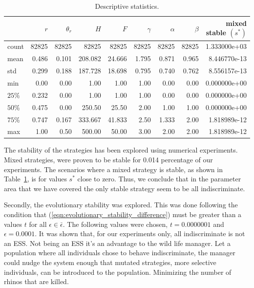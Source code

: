 \documentclass[10pt]{article}
\begin{document}
\begin{table}[!hbtp]
	\begin{center}
\begin{tabular}{lrrrrrrrr}
\toprule {} &              \(r\) &        \(\theta_r\) &              \(H\) &              \(F\) &          \(\gamma\) &          \(\alpha\) &          \(\beta\) &  mixed stable \((s^*)\)\\
\midrule
count         &  82825 &  82825 &  82825 &  82825 &  82825 &  82825 &  82825 &   1.333000e+03 \\
mean         &     0.486 &      0.101 &    208.082 &     24.666 &      1.795 &      0.871 &      0.965 & 8.446770e-13 \\
std             &       0.299 &      0.188 &    187.728 &     18.698 &      0.795 &      0.740 &      0.762 &      8.556157e-13 \\
min   		&         0.00 &      0.00 &      1.00 &      1.00 &      1.00 &      0.00 &      0.00 &    0.000000e+00 \\
\(25\)\%  	&      0.232 &      0.00 &      1.00 &      1.00 &      1.00 &      0.00 &      0.00 &     0.000000e+00 \\
\(50\)\%  	&      0.475 &      0.00 &    250.50 &     25.50 &      2.00 &      1.00 &      1.00 &      0.000000e+00 \\
\(75\)\%  	&       0.747 &      0.167 &    333.667 &     41.833 &      2.50 &      1.333 &      2.00 &        1.818989e-12 \\
max   		&       1.00 &      0.50 &    500.00 &     50.00 &      3.00 &      2.00 &      2.00 &           1.818989e-12 \\
\bottomrule
\end{tabular}
      \caption{Descriptive statistics.}
      \label{tbl:descriptive_stats}
  	\end{center}
\end{table}

The stability of the strategies has been explored using numerical experiments. 
Mixed strategies, were proven to be stable for 0.014 percentage of our
experiments. The scenarios where a mixed strategy is stable, as shown in 
Table~\ref{tbl:descriptive_stats}, is for values \(s^*\)  close to zero. Thus, we
conclude that in the parameter area that we have covered the only stable
strategy seem to be all indiscriminate. 

Secondly, the evolutionary stability was explored. This was done following the condition that 
(\ref{eqn:evolutionary_stability_difference}) must be greater than a values \(t\) for all \(\epsilon
\in \bar{\epsilon}\). The following values were chosen, \(t=0.0000001\) and \(\epsilon=0.0001\). 
It was shown that, for our experiments only, all indiscriminate is not an ESS. Not being an ESS
it's an advantage to the wild life manager. Let a population where all individuals chose to behave
indiscriminate, the manager could nudge the system enough that mutated strategies, more
selective individuals, can be introduced to the population. Minimizing the number of rhinos
that are killed.
\end{document}
